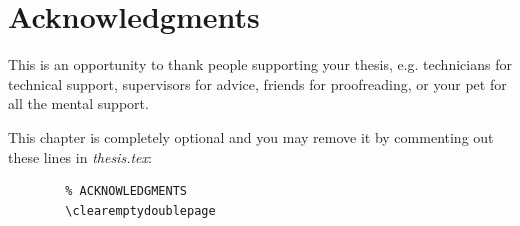 \chapter*{Acknowledgments} 
{
    \color{orange}

    This is an opportunity to thank people supporting your thesis, e.g. technicians for technical support, supervisors for advice, friends for proofreading, or your pet for all the mental support. 
    
    This chapter is completely optional and you may remove it by commenting out these lines in \emph{thesis.tex}:
    \begin{Verbatim}
        % ACKNOWLEDGMENTS
        \clearemptydoublepage
        
    \end{Verbatim}
}
